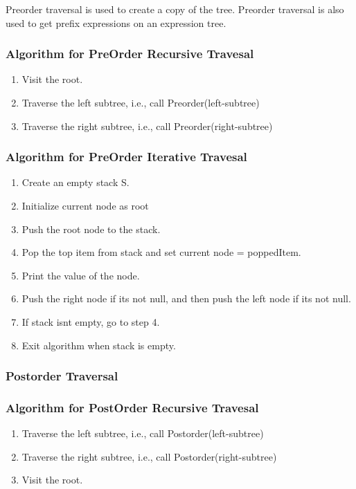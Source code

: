 \documentclass[11pt]{article}
\begin{document}
Preorder traversal is used to create a copy of the tree. Preorder traversal is also used to get prefix expressions on an expression tree.

\subsubsection{Algorithm for PreOrder Recursive Travesal}

\begin{enumerate}
    \item Visit the root.
    \item Traverse the left subtree, i.e., call Preorder(left-subtree)
    \item Traverse the right subtree, i.e., call Preorder(right-subtree)
\end{enumerate}

\subsubsection{Algorithm for PreOrder Iterative Travesal}

\begin{enumerate}
    \item Create an empty stack S.
    \item Initialize current node as root
    \item Push the root node to the stack. 
    \item Pop the top item from stack and set current node = poppedItem.
    \item Print the value of the node. 
    \item Push the right node if its not null, and then push the left node if its not null. 
    \item If stack isnt empty, go to step 4. 
    \item Exit algorithm when stack is empty.
\end{enumerate}


\subsubsection{Postorder Traversal}

\subsubsection{Algorithm for PostOrder Recursive Travesal}

\begin{enumerate}
    \item Traverse the left subtree, i.e., call Postorder(left-subtree)
    \item Traverse the right subtree, i.e., call Postorder(right-subtree)
    \item Visit the root.
\end{enumerate}
\end{document}
